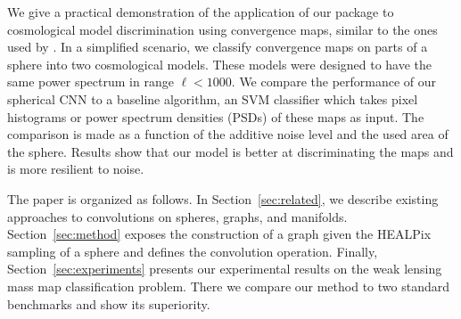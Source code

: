 \documentclass[final,twocolumn,3p,times,authoryear]{elsarticle}
\newcommand{\secref}[1]{Section~\ref{sec:#1}}
\newcommand{\1}{\b{1}}              %
\newcommand{\0}{\b{0}}              %
\begin{document}
We give a practical demonstration of the application of our package to cosmological model discrimination using convergence maps, similar to the ones used by \citet{schmelze2017cosmologicalmodel}.
In a simplified scenario, we classify convergence maps on parts of a sphere into two cosmological models.
These models were designed to have the same power spectrum in range $\ell < 1000$.
We compare the performance of our spherical CNN to a baseline algorithm, an SVM classifier which takes pixel histograms or power spectrum densities (PSDs) of these maps as input.
The comparison is made as a function of the additive noise level and the used area of the sphere. Results show that our model is better at discriminating the maps and is more resilient to noise.

The paper is organized as follows.
In \secref{related}, we describe existing approaches to convolutions on spheres, graphs, and manifolds.
\secref{method} exposes the construction of a graph given the HEALPix sampling of a sphere and defines the convolution operation.
Finally, \secref{experiments} presents our experimental results on the weak lensing mass map classification problem. There we compare our method to two standard benchmarks and show its superiority.

\end{document}
